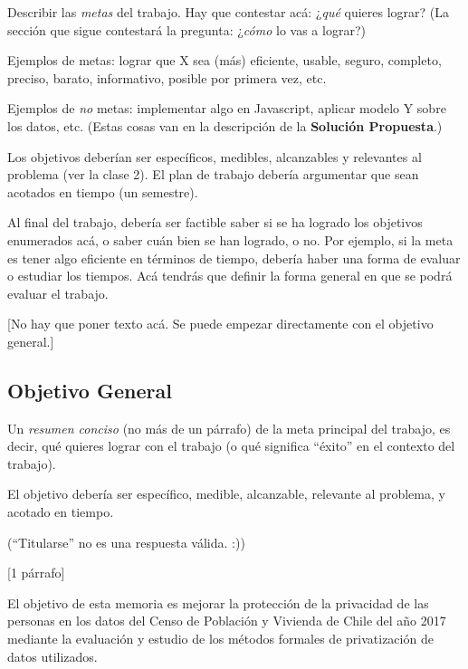 \documentclass[informe]{upropuesta}
\begin{document}
\begin{pauta}
Describir las \textit{metas} del trabajo. Hay que contestar acá: ¿\textit{qué} quieres lograr? (La sección que sigue contestará la pregunta: ¿\textit{cómo} lo vas a lograr?)

Ejemplos de metas: lograr que X sea (más) eficiente, usable, seguro, completo, preciso, barato, informativo, posible por primera vez, etc.

Ejemplos de \textit{no} metas: implementar algo en Javascript, aplicar modelo Y sobre los datos, etc. (Estas cosas van en la descripción de la \textbf{Solución Propuesta}.)

Los objetivos deberían ser específicos, medibles, alcanzables y relevantes al problema (ver la clase 2). El plan de trabajo debería argumentar que sean acotados en tiempo (un semestre).

Al final del trabajo, debería ser factible saber si se ha logrado los objetivos enumerados acá, o saber cuán bien se han logrado, o no. Por ejemplo, si la meta es tener algo eficiente en términos de tiempo, debería haber una forma de evaluar o estudiar los tiempos. Acá tendrás que definir la forma general en que se podrá evaluar el trabajo.

[No hay que poner texto acá. Se puede empezar directamente con el objetivo general.]
\end{pauta}

\subsection*{Objetivo General}\label{sec:obj-g}

\begin{pauta}
Un \textit{resumen conciso} (no más de un párrafo) de la meta principal del trabajo, es decir, qué quieres lograr con el trabajo (o qué significa ``éxito'' en el contexto del trabajo).

El objetivo debería ser específico, medible, alcanzable, relevante al problema, y acotado en tiempo.

(``Titularse'' no es una respuesta válida. :))

[1 párrafo]
\end{pauta}

El objetivo de esta memoria es mejorar la protección de la privacidad de las personas en los datos del Censo de Población y Vivienda de Chile del año 2017 mediante la evaluación y estudio de los métodos formales de privatización de datos utilizados.
\end{document}
